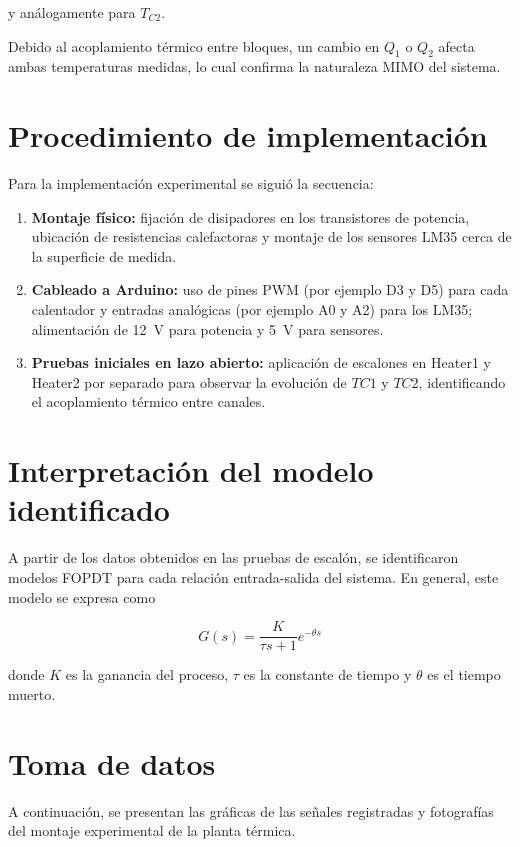 \documentclass[letterpaper,12pt]{article}
\begin{document}
y análogamente para $T_{C2}$.

Debido al acoplamiento térmico entre bloques, un cambio en $Q_1$ o $Q_2$ afecta ambas temperaturas medidas, lo cual confirma la naturaleza MIMO del sistema.

\section{Procedimiento de implementación}

Para la implementación experimental se siguió la secuencia:

\begin{enumerate}
    \item \textbf{Montaje físico:} fijación de disipadores en los transistores de potencia, ubicación de resistencias calefactoras y montaje de los sensores LM35 cerca de la superficie de medida.
    \item \textbf{Cableado a Arduino:} uso de pines PWM (por ejemplo D3 y D5) para cada calentador y entradas analógicas (por ejemplo A0 y A2) para los LM35; alimentación de \SI{12}{V} para potencia y \SI{5}{V} para sensores.
    \item \textbf{Pruebas iniciales en lazo abierto:} aplicación de escalones en Heater1 y Heater2 por separado para observar la evolución de $TC1$ y $TC2$, identificando el acoplamiento térmico entre canales.
\end{enumerate}


\section{Interpretación del modelo identificado}

A partir de los datos obtenidos en las pruebas de escalón, se identificaron modelos FOPDT para cada relación entrada-salida del sistema. En general, este modelo se expresa como

\begin{equation}
    G(s) = \frac{K}{\tau s + 1} e^{-\theta s}
\end{equation}

donde $K$ es la ganancia del proceso, $\tau$ es la constante de tiempo y $\theta$ es el tiempo muerto.

\section*{Toma de datos}

A continuación, se presentan las gráficas de las señales registradas y fotografías del montaje experimental de la planta térmica.
\end{document}
